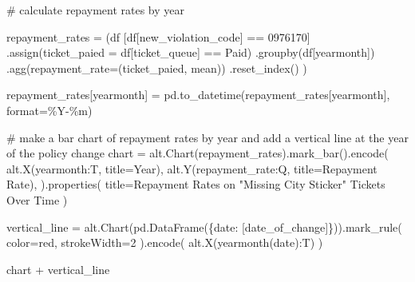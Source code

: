 \documentclass[
  letterpaper,
  DIV=11,
  numbers=noendperiod]{scrartcl}
\newenvironment{Shaded}{\begin{snugshade}}{\end{snugshade}}
\newcommand{\BuiltInTok}[1]{\textcolor[rgb]{0.00,0.23,0.31}{#1}}
\newcommand{\CommentTok}[1]{\textcolor[rgb]{0.37,0.37,0.37}{#1}}
\newcommand{\DecValTok}[1]{\textcolor[rgb]{0.68,0.00,0.00}{#1}}
\newcommand{\NormalTok}[1]{\textcolor[rgb]{0.00,0.23,0.31}{#1}}
\newcommand{\OperatorTok}[1]{\textcolor[rgb]{0.37,0.37,0.37}{#1}}
\newcommand{\StringTok}[1]{\textcolor[rgb]{0.13,0.47,0.30}{#1}}
\begin{document}
\begin{Shaded}
\begin{Highlighting}[]
\CommentTok{\# calculate repayment rates by year}

\NormalTok{repayment\_rates }\OperatorTok{=}\NormalTok{ (df}
\NormalTok{    [df[}\StringTok{\textquotesingle{}new\_violation\_code\textquotesingle{}}\NormalTok{] }\OperatorTok{==} \StringTok{\textquotesingle{}0976170\textquotesingle{}}\NormalTok{]}
\NormalTok{    .assign(ticket\_paied }\OperatorTok{=}\NormalTok{ df[}\StringTok{\textquotesingle{}ticket\_queue\textquotesingle{}}\NormalTok{] }\OperatorTok{==} \StringTok{\textquotesingle{}Paid\textquotesingle{}}\NormalTok{)}
\NormalTok{    .groupby(df[}\StringTok{\textquotesingle{}yearmonth\textquotesingle{}}\NormalTok{])}
\NormalTok{    .agg(repayment\_rate}\OperatorTok{=}\NormalTok{(}\StringTok{\textquotesingle{}ticket\_paied\textquotesingle{}}\NormalTok{, }\StringTok{\textquotesingle{}mean\textquotesingle{}}\NormalTok{))}
\NormalTok{    .reset\_index()}
\NormalTok{)}

\NormalTok{repayment\_rates[}\StringTok{\textquotesingle{}yearmonth\textquotesingle{}}\NormalTok{] }\OperatorTok{=}\NormalTok{ pd.to\_datetime(repayment\_rates[}\StringTok{\textquotesingle{}yearmonth\textquotesingle{}}\NormalTok{], }\BuiltInTok{format}\OperatorTok{=}\StringTok{\textquotesingle{}\%Y{-}\%m\textquotesingle{}}\NormalTok{)}

\CommentTok{\# make a bar chart of repayment rates by year and add a vertical line at the year of the policy change}
\NormalTok{chart }\OperatorTok{=}\NormalTok{ alt.Chart(repayment\_rates).mark\_bar().encode(}
\NormalTok{    alt.X(}\StringTok{\textquotesingle{}yearmonth:T\textquotesingle{}}\NormalTok{, title}\OperatorTok{=}\StringTok{\textquotesingle{}Year\textquotesingle{}}\NormalTok{),}
\NormalTok{    alt.Y(}\StringTok{\textquotesingle{}repayment\_rate:Q\textquotesingle{}}\NormalTok{, title}\OperatorTok{=}\StringTok{\textquotesingle{}Repayment Rate\textquotesingle{}}\NormalTok{),}
\NormalTok{).properties(}
\NormalTok{    title}\OperatorTok{=}\StringTok{\textquotesingle{}Repayment Rates on "Missing City Sticker" Tickets Over Time\textquotesingle{}}
\NormalTok{)}

\NormalTok{vertical\_line }\OperatorTok{=}\NormalTok{ alt.Chart(pd.DataFrame(\{}\StringTok{\textquotesingle{}date\textquotesingle{}}\NormalTok{: [date\_of\_change]\})).mark\_rule(}
\NormalTok{    color}\OperatorTok{=}\StringTok{\textquotesingle{}red\textquotesingle{}}\NormalTok{,}
\NormalTok{    strokeWidth}\OperatorTok{=}\DecValTok{2}
\NormalTok{).encode(}
\NormalTok{    alt.X(}\StringTok{\textquotesingle{}yearmonth(date):T\textquotesingle{}}\NormalTok{)}
\NormalTok{)}

\NormalTok{chart }\OperatorTok{+}\NormalTok{ vertical\_line}
\end{Highlighting}
\end{Shaded}
\end{document}
